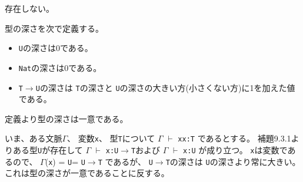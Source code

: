 \documentclass[uplatex,dvipdfmx,ja=standard]{bxjsarticle}
\begin{document}
\newcommand{\typing}[3]{#1 $\vdash$ #2{\tt:}#3}

\newcommand{\varx}{{\tt x}}
\newcommand{\typet}{{\tt T}}
\newcommand{\typeu}{{\tt U}}
\newcommand{\tybool}{{\tt U}}
\newcommand{\tynat}{{\tt Nat}}
\newcommand{\ctxtg}{{$\Gamma$}}
\newcommand{\funarrow}{{$\rightarrow$}}

存在しない。

型の深さを次で定義する。
\begin{itemize}
\item \tybool の深さは0である。
\item \tynat の深さは0である。
\item \typet \funarrow \typeu の深さは
		\typet の深さと \typeu の深さの大きい方(小さくない方)に1を加えた値である。
\end{itemize}

定義より型の深さは一意である。

いま、ある文脈\ctxtg 、 変数\varx 、 型\typet について \typing{\ctxtg}{\varx \varx}{\typet} であるとする。
補題9.3.1よりある型\typeu が存在して
\typing{\ctxtg}{\varx}{\typeu \funarrow \typet}および
\typing{\ctxtg}{\varx}{\typeu}
が成り立つ。
\varx は変数であるので、
\ctxtg(\varx) = \typeu = \typeu \funarrow \typet
であるが、
\typeu \funarrow \typet の深さは \typeu の深さより常に大きい。これは型の深さが一意であることに反する。
\end{document}
